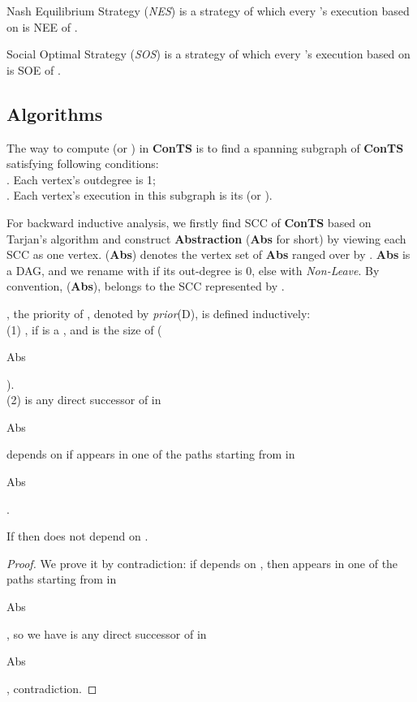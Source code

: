 \documentclass{acm_proc_article-sp}
\begin{document}
\begin{definition}
\textsf{Nash Equilibrium Strategy} (\textit{NES}) is a strategy of which every 's execution based on is NEE of .
\end{definition}

\begin{definition}
\textsf{Social Optimal Strategy} (\textit{SOS}) is a strategy of which every 's execution based on is SOE of .
\end{definition}

\subsection{Algorithms}
The way to compute  (or ) in \textbf{ConTS} is to find a spanning subgraph of \textbf{ConTS} satisfying following conditions:\\
. Each vertex's outdegree is 1;\\
. Each vertex's execution in this subgraph is its  (or ).

For backward inductive analysis, we firstly find SCC of \textbf{ConTS} based on Tarjan's algorithm \cite{reinhard} and construct \textbf{Abstraction} (\textbf{Abs} for short) by viewing each SCC as one vertex. (\textbf{Abs}) denotes the vertex set of \textbf{Abs} ranged over by . \textbf{Abs} is a DAG, and we rename  with  if its out-degree is 0, else with \textit{Non-Leave}. By convention, (\textbf{Abs}),  belongs to the SCC represented by .
\begin{definition}
, the \textsf{priority} of , denoted by \textit{prior}(D), is defined inductively:\\
(1) , if  is a , and  is the size of (\begin{bf}{Abs}\end{bf}).\\
(2)   is any direct successor of  in \begin{bf}Abs\end{bf}
\end{definition}

\begin{definition}
 \textsf{depends on}  if  appears in one of the paths starting from  in \begin{bf}Abs\end{bf}.
\end{definition}

\begin{Theorem}
If  then  does not depend on .
\end{Theorem}
\begin{proof}
We prove it by contradiction: if  depends on , then  appears in one of the paths starting from  in \begin{bf}Abs\end{bf}, so we have   is any direct successor of  in \begin{bf}Abs\end{bf}, contradiction.
\end{proof}
\end{document}
